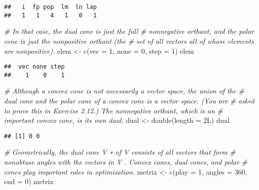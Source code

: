 \documentclass[
]{article}
\newenvironment{Shaded}{\begin{snugshade}}{\end{snugshade}}
\newcommand{\AttributeTok}[1]{\textcolor[rgb]{0.77,0.63,0.00}{#1}}
\newcommand{\CommentTok}[1]{\textcolor[rgb]{0.56,0.35,0.01}{\textit{#1}}}
\newcommand{\DecValTok}[1]{\textcolor[rgb]{0.00,0.00,0.81}{#1}}
\newcommand{\FunctionTok}[1]{\textcolor[rgb]{0.00,0.00,0.00}{#1}}
\newcommand{\NormalTok}[1]{#1}
\newcommand{\OtherTok}[1]{\textcolor[rgb]{0.56,0.35,0.01}{#1}}
\begin{document}
\begin{verbatim}
##   i  fp pop  lm  ln lap 
##   1   1   4   1   0   1
\end{verbatim}

\begin{Shaded}
\begin{Highlighting}[]
\CommentTok{\# In that case, the dual cone is just the full}
\CommentTok{\# nonnegative orthant, and the polar cone is just the nonpositive orthant (the}
\CommentTok{\# set of all vectors all of whose elements are nonpositive).}
\NormalTok{elem }\OtherTok{\textless{}{-}} \FunctionTok{c}\NormalTok{(}\AttributeTok{vec =} \DecValTok{1}\NormalTok{, }\AttributeTok{none =} \DecValTok{0}\NormalTok{, }\AttributeTok{step =} \DecValTok{1}\NormalTok{)}
\NormalTok{elem}
\end{Highlighting}
\end{Shaded}

\begin{verbatim}
##  vec none step 
##    1    0    1
\end{verbatim}

\begin{Shaded}
\begin{Highlighting}[]
\CommentTok{\# Although a convex cone is not necessarily a vector space, the union of the}
\CommentTok{\# dual cone and the polar cone of a convex cone is a vector space. (You are}
\CommentTok{\# asked to prove this in Exercise 2.12.) The nonnegative orthant, which is an}
\CommentTok{\# important convex cone, is its own dual.}
\NormalTok{dual }\OtherTok{\textless{}{-}} \FunctionTok{double}\NormalTok{(}\AttributeTok{length =}\NormalTok{ 2L)}
\NormalTok{dual}
\end{Highlighting}
\end{Shaded}

\begin{verbatim}
## [1] 0 0
\end{verbatim}

\begin{Shaded}
\begin{Highlighting}[]
\CommentTok{\# Geometrically, the dual cone V ∗ of V consists of all vectors that form}
\CommentTok{\# nonobtuse angles with the vectors in V . Convex cones, dual cones, and polar}
\CommentTok{\# cones play important roles in optimization.}
\NormalTok{metrix }\OtherTok{\textless{}{-}} \FunctionTok{c}\NormalTok{(}\AttributeTok{play =} \DecValTok{1}\NormalTok{, }\AttributeTok{angles =} \DecValTok{360}\NormalTok{, }\AttributeTok{end =} \DecValTok{0}\NormalTok{)}
\NormalTok{metrix}
\end{Highlighting}
\end{Shaded}
\end{document}
